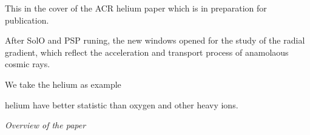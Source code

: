 
This in the cover of the ACR helium paper which is in preparation for publication.

After SolO and PSP runing, the new windows opened for the study of the radial gradient, which reflect the acceleration and transport process of anamolaous cosmic rays.

We take the helium as example

helium have better statistic than oxygen and other heavy ions.



\textit{Overview of the paper}


%
